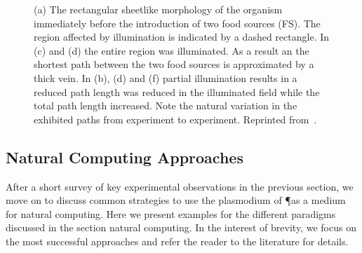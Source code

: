 			\begin{figure}[htp]
				\centering
				\newline
				\newline

				\caption[Classic maze experiment with \P]{(a)  The  rectangular  sheetlike  morphology  of  the organism  immediately  before  the  introduction  of  two  food sources (FS). The region affected by illumination is indicated by a dashed rectangle. In (c) and (d) the entire region was illuminated. As a result an the shortest path between the two food sources is approximated by a thick vein. In (b), (d) and (f) partial illumination results in a reduced path length was reduced in the illuminated field while the total path length increased. Note the natural variation in the exhibited paths from experiment to experiment.  Reprinted from~\cite{PhysRevLett.99.068104}.}
				\label{fig:snell}
			\end{figure}

			\FloatBarrier

	\subsection{Natural Computing Approaches}

		After a short survey of key experimental observations in the previous section, we move on to discuss common strategies to use the plasmodium of \P as a medium for natural computing. Here we present examples for the different paradigms discussed in the section natural computing. In the interest of brevity, we focus on the most successful approaches and refer the reader to the literature for details.

